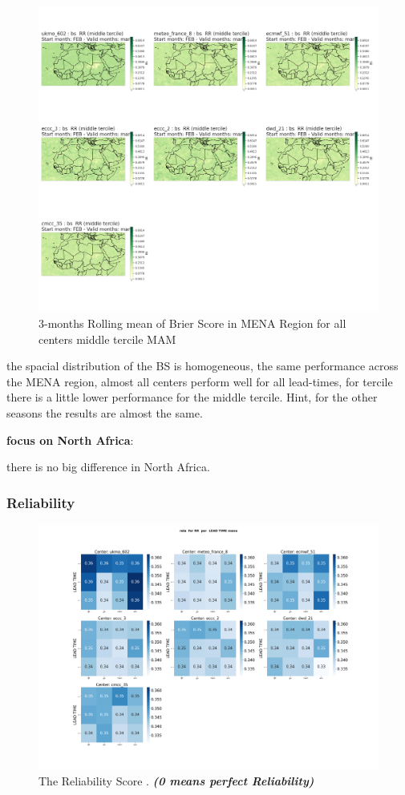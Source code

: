 \begin{figure}[H]
\includegraphics[scale=0.3]{plots/prob/bs/bs_mam_RR_middle.png}
\caption{3-months Rolling mean of Brier Score in MENA Region for all centers middle tercile MAM}
\end{figure}

the spacial distribution of the BS is homogeneous, the same performance across the MENA region, almost all centers perform well for all lead-times, for  tercile there is a little lower performance for the middle tercile.
Hint, for the other seasons the results are almost the same. 

\vspace{1.5cm}
\textbf{focus on North Africa}:

there is no big difference in North Africa.


\subsubsection{Reliability}

\begin{figure}[H]
    \centering
    \includegraphics[scale=0.25]{plots/prob/rela/rela_RR_mena.png}
    \caption{The Reliability Score  . \textbf{\textit{(0 means perfect Reliability)}}}
\end{figure}

